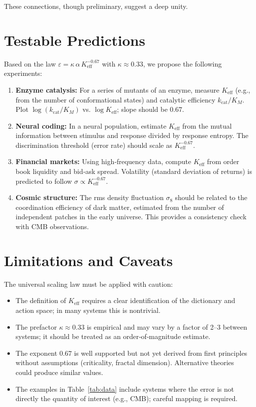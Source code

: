 \documentclass[12pt]{article}
\newcommand{\Keff}{K_{\mathrm{eff}}}
\newcommand{\eps}{\varepsilon}
\begin{document}
	These connections, though preliminary, suggest a deep unity.
	
	\section{Testable Predictions}
	\label{sec:predictions}
	
	Based on the law \(\eps = \kappa\,\alpha\,\Keff^{-0.67}\) with \(\kappa \approx 0.33\), we propose the following experiments:
	
	\begin{enumerate}
		\item \textbf{Enzyme catalysis:} For a series of mutants of an enzyme, measure \(\Keff\) (e.g., from the number of conformational states) and catalytic efficiency \(k_{\text{cat}}/K_M\). Plot \(\log(k_{\text{cat}}/K_M)\) vs. \(\log \Keff\); slope should be \(0.67\).
		\item \textbf{Neural coding:} In a neural population, estimate \(\Keff\) from the mutual information between stimulus and response divided by response entropy. The discrimination threshold (error rate) should scale as \(\Keff^{-0.67}\).
		\item \textbf{Financial markets:} Using high‑frequency data, compute \(\Keff\) from order book liquidity and bid‑ask spread. Volatility (standard deviation of returns) is predicted to follow \(\sigma \propto \Keff^{-0.67}\).
		\item \textbf{Cosmic structure:} The rms density fluctuation \(\sigma_8\) should be related to the coordination efficiency of dark matter, estimated from the number of independent patches in the early universe. This provides a consistency check with CMB observations.
	\end{enumerate}
	
	\section{Limitations and Caveats}
	\label{sec:limitations}
	
	The universal scaling law must be applied with caution:
	\begin{itemize}
		\item The definition of \(\Keff\) requires a clear identification of the dictionary and action space; in many systems this is nontrivial.
		\item The prefactor \(\kappa \approx 0.33\) is empirical and may vary by a factor of 2–3 between systems; it should be treated as an order‑of‑magnitude estimate.
		\item The exponent \(0.67\) is well supported but not yet derived from first principles without assumptions (criticality, fractal dimension). Alternative theories could produce similar values.
		\item The examples in Table~\ref{tab:data} include systems where the error is not directly the quantity of interest (e.g., CMB); careful mapping is required.
	\end{itemize}
	
\end{document}
